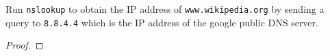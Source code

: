 \documentclass[../../main.tex]{subfiles}
\begin{document}
\begin{wts}
Run \lstinline{nslookup} to obtain the IP address of \lstinline{www.wikipedia.org} by sending a query to \lstinline{8.8.4.4} which is the IP address of the google public DNS server.   
\end{wts}
\begin{proof}

\end{proof}
\end{document}
